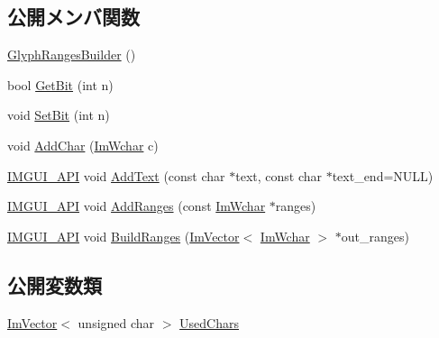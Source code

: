 \subsection*{公開メンバ関数}
\begin{DoxyCompactItemize}
\item 
\mbox{\hyperlink{struct_im_font_atlas_1_1_glyph_ranges_builder_a3c8d81e21a62329830d4c36ca4a1fbc3}{Glyph\+Ranges\+Builder}} ()
\item 
bool \mbox{\hyperlink{struct_im_font_atlas_1_1_glyph_ranges_builder_a157a4d95c361d717c073d5815d576eb5}{Get\+Bit}} (int n)
\item 
void \mbox{\hyperlink{struct_im_font_atlas_1_1_glyph_ranges_builder_aff570c016f17c1cd8d3a819b5f7a056c}{Set\+Bit}} (int n)
\item 
void \mbox{\hyperlink{struct_im_font_atlas_1_1_glyph_ranges_builder_a6b6b18e5c5fc4366afc98ff7391ba0bf}{Add\+Char}} (\mbox{\hyperlink{imgui_8h_af2c7badaf05a0008e15ef76d40875e97}{Im\+Wchar}} c)
\item 
\mbox{\hyperlink{imgui_8h_a43829975e84e45d1149597467a14bbf5}{I\+M\+G\+U\+I\+\_\+\+A\+PI}} void \mbox{\hyperlink{struct_im_font_atlas_1_1_glyph_ranges_builder_a6c0f9756dc8ea184920d5ff28bfdb669}{Add\+Text}} (const char $\ast$text, const char $\ast$text\+\_\+end=N\+U\+LL)
\item 
\mbox{\hyperlink{imgui_8h_a43829975e84e45d1149597467a14bbf5}{I\+M\+G\+U\+I\+\_\+\+A\+PI}} void \mbox{\hyperlink{struct_im_font_atlas_1_1_glyph_ranges_builder_a93174d62f8cf366528b654806ca7be49}{Add\+Ranges}} (const \mbox{\hyperlink{imgui_8h_af2c7badaf05a0008e15ef76d40875e97}{Im\+Wchar}} $\ast$ranges)
\item 
\mbox{\hyperlink{imgui_8h_a43829975e84e45d1149597467a14bbf5}{I\+M\+G\+U\+I\+\_\+\+A\+PI}} void \mbox{\hyperlink{struct_im_font_atlas_1_1_glyph_ranges_builder_aa55b5710971adef2e4c690a3e46de6d5}{Build\+Ranges}} (\mbox{\hyperlink{class_im_vector}{Im\+Vector}}$<$ \mbox{\hyperlink{imgui_8h_af2c7badaf05a0008e15ef76d40875e97}{Im\+Wchar}} $>$ $\ast$out\+\_\+ranges)
\end{DoxyCompactItemize}
\subsection*{公開変数類}
\begin{DoxyCompactItemize}
\item 
\mbox{\hyperlink{class_im_vector}{Im\+Vector}}$<$ unsigned char $>$ \mbox{\hyperlink{struct_im_font_atlas_1_1_glyph_ranges_builder_a369924c3fbeeac0402a6c02d62dd4a71}{Used\+Chars}}
\end{DoxyCompactItemize}


